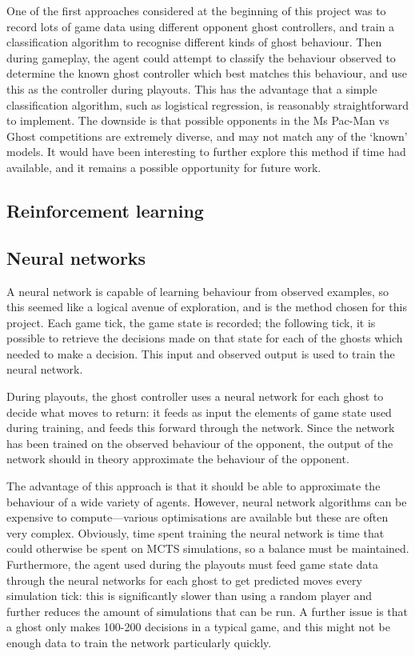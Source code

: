 One of the first approaches considered at the beginning of this project was to record lots of game data using different opponent ghost controllers, and train a classification algorithm to recognise different kinds of ghost behaviour.  Then during gameplay, the agent could attempt to classify the behaviour observed to determine the known ghost controller which best matches this behaviour, and use this as the controller during playouts.  This has the advantage that a simple classification algorithm, such as logistical regression, is reasonably straightforward to implement.  The downside is that possible opponents in the Ms Pac-Man vs Ghost competitions are extremely diverse, and may not match any of the `known' models.  It would have been interesting to further explore this method if time had available, and it remains a possible opportunity for future work.

\subsection{Reinforcement learning}



\subsection{Neural networks}

A neural network is capable of learning behaviour from observed examples, so this seemed like a logical avenue of exploration, and is the method chosen for this project.  Each game tick, the game state is recorded; the following tick, it is possible to retrieve the decisions made on that state for each of the ghosts which needed to make a decision.  This input and observed output is used to train the neural network.

During playouts, the ghost controller uses a neural network for each ghost to decide what moves to return: it feeds as input the elements of game state used during training, and feeds this forward through the network.  Since the network has been trained on the observed behaviour of the opponent, the output of the network should in theory approximate the behaviour of the opponent.

The advantage of this approach is that it should be able to approximate the behaviour of a wide variety of agents.  However, neural network algorithms can be expensive to compute---various optimisations are available but these are often very complex.  Obviously, time spent training the neural network is time that could otherwise be spent on MCTS simulations, so a balance must be maintained.  Furthermore, the agent used during the playouts must feed game state data through the neural networks for each ghost to get predicted moves every simulation tick: this is significantly slower than using a random player and further reduces the amount of simulations that can be run.  A further issue is that a ghost only makes 100-200 decisions in a typical game, and this might not be enough data to train the network particularly quickly.

